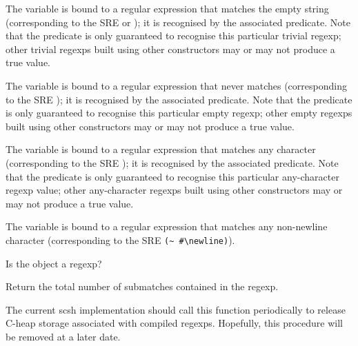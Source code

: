 \begin{desc}
The variable  is bound to a regular expression
that matches the empty string (corresponding to the SRE  or \ex{(:)});
it is recognised by the associated predicate. 
Note that the predicate is only guaranteed to recognise
this particular trivial regexp; other trivial regexps built using
other constructors may or may not produce a true value.
\end{desc}

\begin{desc}
The variable  is bound to a regular expression
that never matches (corresponding to the SRE \ex{(|)});
it is recognised by the associated predicate. 
Note that the predicate is only guaranteed to recognise
this particular empty regexp; other empty regexps built using
other constructors may or may not produce a true value.
\end{desc}

\begin{desc}
The variable  is bound to a regular expression
that matches any character (corresponding to the SRE ); 
it is recognised by the associated predicate. 
Note that the predicate is only guaranteed to recognise
this particular any-character regexp value; other any-character
regexps built using other constructors may or may not produce a true value.
\end{desc}


\begin{desc}
The variable  is bound to a regular expression
that matches any non-newline character
(corresponding to the SRE \verb|(~ #\newline)|).
\end{desc}

\begin{desc}
Is the object a regexp?
\end{desc}

\begin{desc}
Return the total number of submatches contained in the regexp.
\end{desc}

\begin{desc}
The current scsh implementation should call this function periodically
to release C-heap storage associated with compiled regexps.
Hopefully, this procedure will be removed at a later date.
\end{desc}


